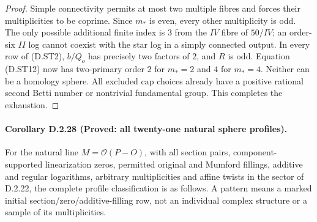\begin{proof}
Simple connectivity permits at most two multiple fibres and
forces their multiplicities to be coprime. Since $m_*$ is
even, every other multiplicity is odd. The only possible
additional finite index is $3$ from the $IV$ fibre of $50/IV$;
an order-six $II$ log cannot coexist with the star log in a
simply connected output. In every row of (D.ST2),
$b/Q_o$ has precisely two factors of $2$, and $R$ is odd.
Equation (D.ST12) now has two-primary order $2$ for $m_*=2$
and $4$ for $m_*=4$. Neither can be a homology sphere.
All excluded cap choices already have a positive rational
second Betti number or nontrivial fundamental group. This
completes the exhaustion.
\end{proof}

\paragraph{Corollary D.2.28 (Proved: all twenty-one natural sphere profiles).}
For the natural line $M=\mathcal O(P-O)$, with all section pairs,
component-supported linearization zeros, permitted original and
Mumford fillings, additive and regular logarithms, arbitrary
multiplicities and affine twists in the sector of D.2.22, the
complete profile classification is as follows. A pattern means
a marked initial section/zero/additive-filling row, not an
individual complex structure or a sample of its multiplicities.
